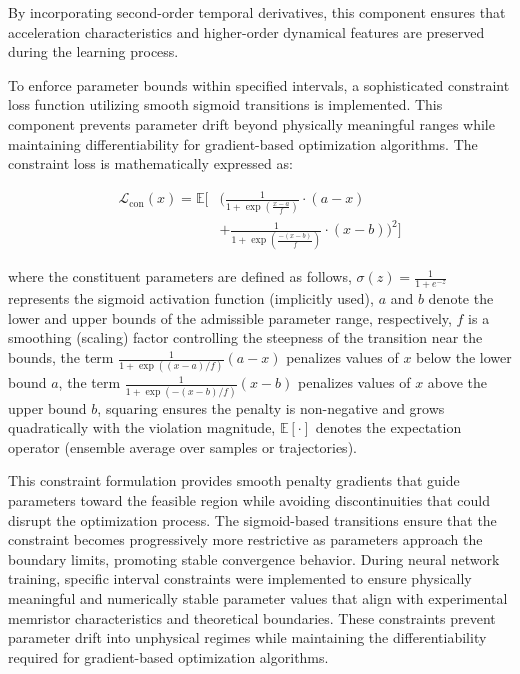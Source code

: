 \documentclass[lettersize,journal]{IEEEtran}
\begin{document}
By incorporating second-order temporal derivatives, this component ensures that acceleration characteristics and higher-order dynamical features are preserved during the learning process.

To enforce parameter bounds within specified intervals, a sophisticated constraint loss function utilizing smooth sigmoid transitions is implemented. This component prevents parameter drift beyond physically meaningful ranges while maintaining differentiability for gradient-based optimization algorithms. The constraint loss is mathematically expressed as:

\begin{equation}
  \begin{split}
    \mathcal{L}_{\mathrm{con}}(x) = \mathbb{E}\Bigg[ & \Bigg(
    \frac{1}{1 + \exp\!\left(\tfrac{x-a}{f}\right)} \cdot (a-x)                                                         \\
                                                     & + \frac{1}{1 + \exp\!\left(\tfrac{-(x-b)}{f}\right)} \cdot (x-b)
      \Bigg)^{2}\Bigg]
  \end{split}
  \label{eq:loss_con}
\end{equation}

where the constituent parameters are defined as follows,
\(\sigma(z) = \tfrac{1}{1+e^{-z}}\) represents the sigmoid activation function (implicitly used),
\(a\) and \(b\) denote the lower and upper bounds of the admissible parameter range, respectively,
\(f\) is a smoothing (scaling) factor controlling the steepness of the transition near the bounds,
the term \(\tfrac{1}{1+\exp((x-a)/f)}(a-x)\) penalizes values of \(x\) below the lower bound \(a\),
the term \(\tfrac{1}{1+\exp(-(x-b)/f)}(x-b)\) penalizes values of \(x\) above the upper bound \(b\),
squaring ensures the penalty is non-negative and grows quadratically with the violation magnitude,
\(\mathbb{E}[\cdot]\) denotes the expectation operator (ensemble average over samples or trajectories).



This constraint formulation provides smooth penalty gradients that guide parameters toward the feasible region while avoiding discontinuities that could disrupt the optimization process. The sigmoid-based transitions ensure that the constraint becomes progressively more restrictive as parameters approach the boundary limits, promoting stable convergence behavior.
During neural network training, specific interval constraints were implemented to ensure physically meaningful and numerically stable parameter values that align with experimental memristor characteristics and theoretical boundaries. These constraints prevent parameter drift into unphysical regimes while maintaining the differentiability required for gradient-based optimization algorithms.
\end{document}

